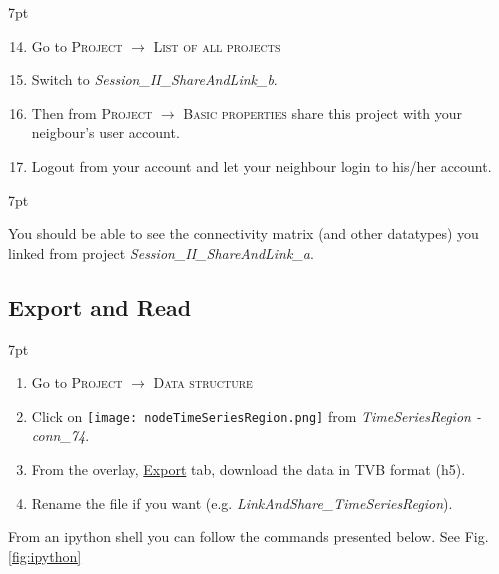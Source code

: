 \documentclass{tufte-handout}
\newenvironment{formal}{%
  \def\FrameCommand{%
    \hspace{1pt}%
    {\color{DarkBlue}\vrule width 2pt}%
    {\color{formalshade}\vrule width 4pt}%
    \colorbox{formalshade}%
  }%
  \MakeFramed{\advance\hsize-\width\FrameRestore}%
  \noindent\hspace{-4.55pt}%
  \begin{adjustwidth}{}{7pt}%
  \vspace{2pt}\vspace{2pt}%
}
{%
  \vspace{2pt}\end{adjustwidth}\endMakeFramed%
}
\newenvironment{blah}{%
  \def\FrameCommand{%
    \hspace{1pt}%
    {\color{DarkOrange}\vrule width 2pt}%
    {\color{PeachPuff}\vrule width 4pt}%
    \colorbox{PeachPuff}%
  }%
  \MakeFramed{\advance\hsize-\width\FrameRestore}%
  \noindent\hspace{-4.55pt}%
  \begin{adjustwidth}{}{7pt}%
  \vspace{2pt}\vspace{2pt}%
}
{%
  \vspace{2pt}\end{adjustwidth}\endMakeFramed%
}
\begin{document}
\begin{formal}
  \begin{enumerate}[resume]
    \setcounter{enumi}{13}
    \item Go to \textsc{Project} $\rightarrow$ \textsc{List of all projects}
    \item Switch to \textit{Session\_II\_ShareAndLink\_b}.
    \item Then from \textsc{Project} $\rightarrow$ \textsc{Basic properties} 
share this project with your neigbour's user account. 
    \item Logout from your account and let your neighbour login to his/her account. 
  \end{enumerate}
\end{formal} 

\begin{blah}
You should be able to see the connectivity matrix (and other datatypes) you linked
from project \textit{Session\_II\_ShareAndLink\_a}.
\end{blah}

\subsection{Export and Read}\label{sec:link_and_share}

\begin{formal}
  \begin{enumerate}
    \item Go to \textsc{Project} $\rightarrow$ \textsc{Data structure}
    \item Click on \texttt{[image: nodeTimeSeriesRegion.png]} from \textit{TimeSeriesRegion - conn\_74}. 
    \item From the overlay, \underline{Export} tab, download the data in TVB format (h5).
    \item Rename the file if you want (e.g. \textit{LinkAndShare\_TimeSeriesRegion}).
  \end{enumerate}
\end{formal} 

From an ipython shell you can follow the commands presented below. See Fig. \ref{fig:ipython}
\end{document}
